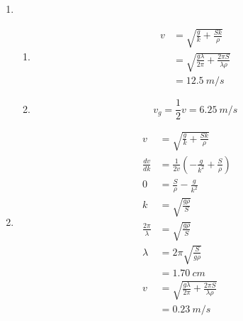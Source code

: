 \documentclass{article}
\begin{document}
\subsection{}

\begin{enumerate}
  \item

        \begin{enumerate}
          \item

                \begin{align*}
                  v & = \sqrt{\frac{g}{k} + \frac{S k}{\rho}}                         \\
                    & = \sqrt{\frac{g \lambda}{2 \pi} + \frac{2 \pi S}{\lambda \rho}} \\
                    & = \qty{12.5}{m/s}
                \end{align*}

          \item \[v_g = \frac{1}{2} v = \qty{6.25}{m/s}\]
        \end{enumerate}

  \item

        \begin{align*}
          v                     & = \sqrt{\frac{g}{k} + \frac{S k}{\rho}}                         \\
          \frac{d v}{d k}       & = \frac{1}{2 v} \left( -\frac{g}{k^2} + \frac{S}{\rho} \right)  \\
          0                     & = \frac{S}{\rho} - \frac{g}{k^2}                                \\
          k                     & = \sqrt{\frac{g \rho}{S}}                                       \\
          \frac{2 \pi}{\lambda} & = \sqrt{\frac{g \rho}{S}}                                       \\
          \lambda               & = 2 \pi \sqrt{\frac{S}{g \rho}}                                 \\
                                & = \qty{1.70}{cm}                                                \\
          v                     & = \sqrt{\frac{g \lambda}{2 \pi} + \frac{2 \pi S}{\lambda \rho}} \\
                                & = \qty{0.23}{m/s}
        \end{align*}
\end{enumerate}
\end{document}
